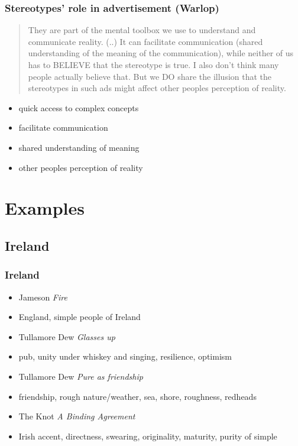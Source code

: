\documentclass{beamer}
\begin{document}
\begin{frame}
 \frametitle{Stereotypes' role in advertisement (Warlop)}
 \begin{quotation}
They are part of the mental toolbox we use to understand and communicate reality. (..) It can facilitate communication (shared understanding of the meaning of the communication), while neither of us has to BELIEVE that the stereotype is true. I also don't think many people actually believe that. But we DO share the illusion that the stereotypes in such ads might affect other peoples perception of reality.   
 \end{quotation}
 \begin{itemize}
  \item quick access to complex concepts
  \item facilitate communication
  \item shared understanding of meaning
  \item other peoples perception of reality
 \end{itemize}
\end{frame}

\section{Examples}
\subsection{Ireland}

\begin{frame}
 \frametitle{Ireland}
 \begin{itemize}
  \item <1-> Jameson \emph{Fire}
  \item <2-> England, simple people of Ireland
  \item<3-> Tullamore Dew \emph{Glasses up}
  \item<4-> pub, unity under whiskey and singing, resilience, optimism
  \item<5-> Tullamore Dew \emph{Pure as friendship}
  \item<6-> friendship, rough nature/weather, sea, shore, roughness, redheads
  \item<7-> The Knot \emph{A Binding Agreement}
  \item<8> Irish accent, directness, swearing, originality, maturity, purity of simple
\end{itemize}
\end{frame}
\end{document}
